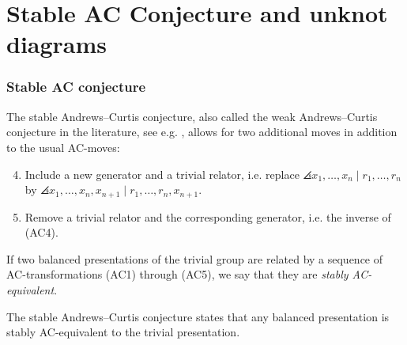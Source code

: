 
\section{Stable AC Conjecture and unknot diagrams}

\subsubsection{Stable AC conjecture}

The stable Andrews--Curtis conjecture, also called the weak Andrews--Curtis conjecture in the literature, see e.g. \cite{MMS,Meier2016,Bagherifard2021}, allows for two additional moves in addition to the usual AC-moves:
\begin{enumerate}[label=(AC\arabic*)]
	\setcounter{enumi}{3}
	\item Include a new generator and a trivial relator, i.e. replace $\angles{x_1, \dots, x_n \mid r_1, \dots, r_n}$ by $\angles{x_1, \dots, x_n, x_{n+1} \mid r_1, \dots, r_n, x_{n+1}}$.
	\item Remove a trivial relator and the corresponding generator, i.e. the inverse of (AC4).
\end{enumerate}

\begin{definition}
If two balanced presentations of the trivial group are related by a sequence of AC-transformations (AC1) through (AC5), we say that they are \textit{stably AC-equivalent}.
\end{definition}
The stable Andrews--Curtis conjecture states that any balanced presentation is stably AC-equivalent to the trivial presentation.

